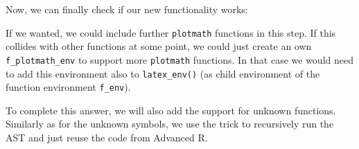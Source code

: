 \documentclass[
]{krantz}
\makeatletter
\newenvironment{Shaded}{\begin{snugshade}}{\end{snugshade}}
\newcommand{\CommentTok}[1]{\textcolor[rgb]{0.56,0.35,0.01}{\textit{#1}}}
\newcommand{\DecValTok}[1]{\textcolor[rgb]{0.00,0.00,0.81}{#1}}
\newcommand{\KeywordTok}[1]{\textcolor[rgb]{0.13,0.29,0.53}{\textbf{#1}}}
\newcommand{\NormalTok}[1]{#1}
\newcommand{\OperatorTok}[1]{\textcolor[rgb]{0.81,0.36,0.00}{\textbf{#1}}}
\newcommand{\StringTok}[1]{\textcolor[rgb]{0.31,0.60,0.02}{#1}}
\newenvironment{kframe}{%
\medskip{}
\setlength{\fboxsep}{.8em}
 \def\at@end@of@kframe{}%
 \ifinner\ifhmode%
  \def\at@end@of@kframe{\end{minipage}}%
  \begin{minipage}{\columnwidth}%
 \fi\fi%
 \def\FrameCommand##1{\hskip\@totalleftmargin \hskip-\fboxsep
 \colorbox{shadecolor}{##1}\hskip-\fboxsep
     \hskip-\linewidth \hskip-\@totalleftmargin \hskip\columnwidth}%
 \MakeFramed {\advance\hsize-\width
   \@totalleftmargin\z@ \linewidth\hsize
   \@setminipage}}%
 {\par\unskip\endMakeFramed%
 \at@end@of@kframe}
\renewenvironment{Shaded}{\begin{kframe}}{\end{kframe}}
\renewcommand{\KeywordTok} [1]{\textcolor[rgb]{0.00,0.44,0.13}{{#1}}}
\renewcommand{\DecValTok}  [1]{\textcolor[rgb]{0.25,0.63,0.44}{{#1}}}
\renewcommand{\StringTok}  [1]{\textcolor[rgb]{0.25,0.44,0.63}{{#1}}}
\renewcommand{\CommentTok} [1]{\textcolor[rgb]{0.38,0.63,0.69}{{#1}}}
\renewcommand{\NormalTok}  [1]{{#1}}
\makeatother
\begin{document}
Now, we can finally check if our new functionality works:

\begin{Shaded}
\end{Shaded}

If we wanted, we could include further \texttt{plotmath} functions in this step. If this collides with other functions at some point, we could just create an own \texttt{f\_plotmath\_env} to support more \texttt{plotmath} functions. In that case we would need to add this environment also to \texttt{latex\_env()} (as child environment of the function environment \texttt{f\_env}).

To complete this answer, we will also add the support for unknown functions. Similarly as for the unknown symbols, we use the trick to recursively run the AST and just reuse the code from Advanced R.
\end{document}
